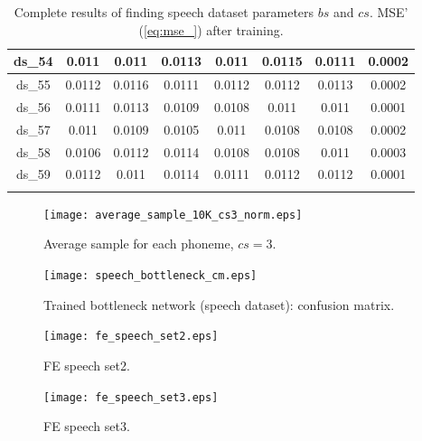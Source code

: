 \begin{longtable}{|c|c|c|c|c|c|c|c|}
ds\_54	& 0.011	& 0.011	& 0.0113	& 0.011	& 0.0115	& 0.0111	& 0.0002	\\ \hline
ds\_55	& 0.0112	& 0.0116	& 0.0111	& 0.0112	& 0.0112	& 0.0113	& 0.0002	\\ \hline
ds\_56	& 0.0111	& 0.0113	& 0.0109	& 0.0108	& 0.011	& 0.011	& 0.0001	\\ \hline
ds\_57	& 0.011	& 0.0109	& 0.0105	& 0.011	& 0.0108	& 0.0108	& 0.0002	\\ \hline
ds\_58	& 0.0106	& 0.0112	& 0.0114	& 0.0108	& 0.0108	& 0.011	& 0.0003	\\ \hline
ds\_59	& 0.0112	& 0.011	& 0.0114	& 0.0111	& 0.0112	& 0.0112	& 0.0001	\\ \hline
\caption{Complete results of finding speech dataset parameters $ bs $ and $ cs $. MSE' (\cref{eq:mse_}) after training.} \label{tab:app:speech_bs_cs_complete_results} \\
\end{longtable}

\begin{figure}[H]
\centering
\texttt{[image: average\_sample\_10K\_cs3\_norm.eps]}
\caption{Average sample for each phoneme, $ cs = 3 $.}
\label{fig:app:speech_average_sample_cs3}
\end{figure}

\begin{figure}[H]
\centering
\texttt{[image: speech\_bottleneck\_cm.eps]}
\caption{Trained bottleneck network (speech dataset): confusion matrix.}
\label{fig:app:speech_bottleneck_cm}
\end{figure}

\begin{figure}[H]
\centering
\texttt{[image: fe\_speech\_set2.eps]}
\caption{FE speech set2.}
\label{fig:examples:speech_fe_set2}
\end{figure}

\begin{figure}[H]
\centering
\texttt{[image: fe\_speech\_set3.eps]}
\caption{FE speech set3.}
\label{fig:examples:speech_fe_set3}
\end{figure}